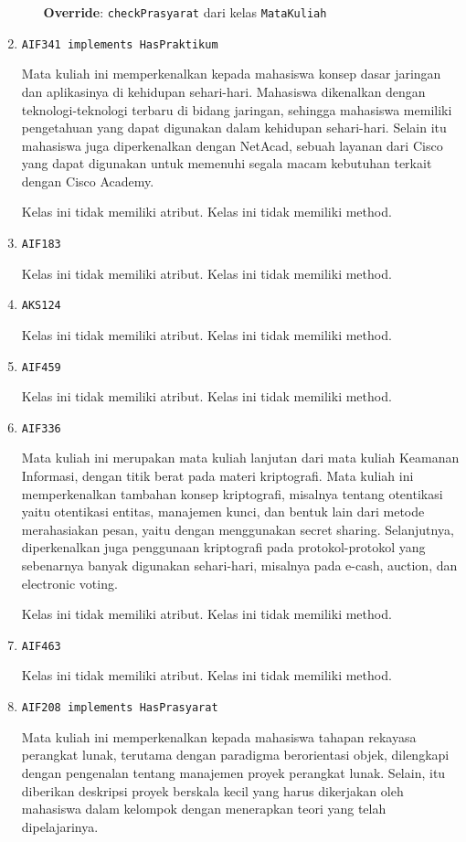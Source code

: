 \documentclass{article}
\begin{document}
\begin{enumerate}
\begin{itemize}
\textbf{Override}: \texttt{checkPrasyarat} dari kelas \texttt{MataKuliah}

\end{itemize}
\item \texttt{AIF341 implements HasPraktikum}

Mata kuliah ini memperkenalkan kepada mahasiswa konsep dasar 
 jaringan dan aplikasinya di kehidupan sehari-hari. Mahasiswa 
 dikenalkan dengan teknologi-teknologi terbaru di bidang jaringan, 
 sehingga mahasiswa memiliki pengetahuan yang dapat digunakan 
 dalam kehidupan sehari-hari. Selain itu mahasiswa juga 
 diperkenalkan dengan NetAcad, sebuah layanan dari Cisco yang 
 dapat digunakan untuk memenuhi segala macam kebutuhan terkait 
 dengan Cisco Academy.

Kelas ini tidak memiliki atribut. Kelas ini tidak memiliki method. \item \texttt{AIF183}



Kelas ini tidak memiliki atribut. Kelas ini tidak memiliki method. \item \texttt{AKS124}



Kelas ini tidak memiliki atribut. Kelas ini tidak memiliki method. \item \texttt{AIF459}



Kelas ini tidak memiliki atribut. Kelas ini tidak memiliki method. \item \texttt{AIF336}

Mata kuliah ini merupakan mata kuliah lanjutan dari mata kuliah Keamanan 
 Informasi, dengan titik berat pada materi kriptografi. Mata kuliah ini 
 memperkenalkan tambahan konsep kriptografi, misalnya tentang otentikasi 
 yaitu otentikasi entitas, manajemen kunci, dan bentuk lain dari metode 
 merahasiakan pesan, yaitu dengan menggunakan secret sharing. Selanjutnya, 
 diperkenalkan juga penggunaan kriptografi pada protokol-protokol yang 
 sebenarnya banyak digunakan sehari-hari, misalnya pada e-cash, auction, 
 dan electronic voting.

Kelas ini tidak memiliki atribut. Kelas ini tidak memiliki method. \item \texttt{AIF463}



Kelas ini tidak memiliki atribut. Kelas ini tidak memiliki method. \item \texttt{AIF208 implements HasPrasyarat}

Mata kuliah ini memperkenalkan kepada mahasiswa tahapan rekayasa perangkat 
 lunak, terutama dengan paradigma berorientasi objek, dilengkapi dengan 
 pengenalan tentang manajemen proyek perangkat lunak.
 Selain, itu diberikan deskripsi proyek berskala kecil yang harus dikerjakan 
 oleh mahasiswa dalam kelompok dengan menerapkan teori yang telah 
 dipelajarinya.


\end{enumerate}
\end{document}
